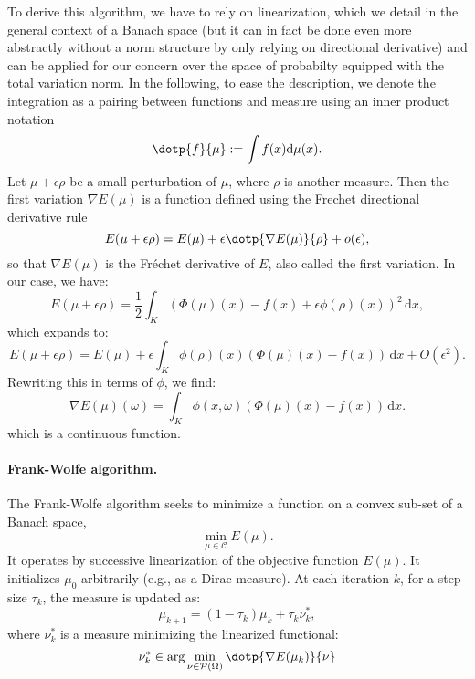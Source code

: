 To derive this algorithm, we have to rely on linearization, which we detail in the general context of a Banach space (but it can in fact be done even more abstractly without a norm structure by only relying on directional derivative) and can be applied for our concern over the space of probabilty equipped with the total variation norm.
%
In the following, to ease the description, we denote the integration as a pairing between functions and measure using an inner product notation
$$
	\dotp{f}{\mu} := \int f(x) \mathrm{d} \mu(x).
$$
Let $\mu + \epsilon \rho$ be a small perturbation of $\mu$, where $\rho$ is another measure. 
%
Then the first variation $\nabla E(\mu)$ is a function defined using the Frechet directional derivative rule 
\[
	E(\mu + \epsilon \rho) = E(\mu) + \epsilon \dotp{\nabla E(\mu)}{\rho} + o(\epsilon),
\]
so that $\nabla E(\mu)$ is the Fréchet derivative of $E$, also called the first variation. In our case, we have:
\[
	E(\mu + \epsilon \rho) = \frac{1}{2} \int_K \left( \Phi(\mu)(x) - f(x) + \epsilon \phi(\rho)(x) \right)^2 \, \mathrm{d}x,
\]
which expands to:
\[
	E(\mu + \epsilon \rho) = E(\mu) + \epsilon \int_K \phi(\rho)(x) \left( \Phi(\mu)(x) - f(x) \right) \, \mathrm{d}x + O(\epsilon^2).
\]
Rewriting this in terms of $\phi$, we find:
\[
	\nabla E(\mu)(\omega) = \int_K \phi(x, \omega) \left( \Phi(\mu)(x) - f(x) \right) \, \mathrm{d}x.
\]
which is a continuous function.

\paragraph{Frank-Wolfe algorithm.}

The Frank-Wolfe algorithm seeks to minimize a function on a convex sub-set of a Banach space, 
$$
	\min_{\mu \in \mathcal{C}} E(\mu).
$$
It operates by successive linearization of the objective function $E(\mu)$. %
%
It initializes $\mu_0$ arbitrarily (e.g., as a Dirac measure). At each iteration $k$, for a step size $\tau_k$, the measure is updated as:
\[
	\mu_{k+1} = (1 - \tau_k) \mu_k + \tau_k \nu_k^*,
\]
where $\nu_k^*$ is a measure minimizing the linearized functional:
\[
	\nu_k^* \in \arg\min_{\nu \in \mathcal{P}(\Omega)} \dotp{\nabla E(\mu_k)}{\nu}
\]

